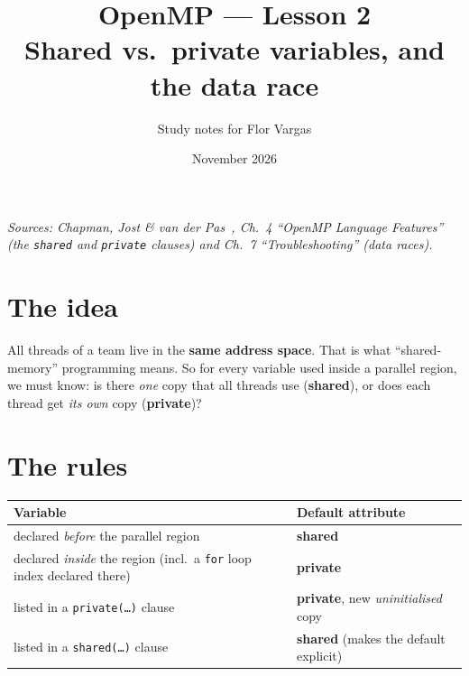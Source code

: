 \documentclass[11pt,a4paper]{article}
\title{\textbf{OpenMP --- Lesson 2}\\[4pt]\large Shared vs.\ private variables, and the data race}
\author{Study notes for Flor Vargas}
\date{November 2026}
\begin{document}
\maketitle

\noindent\textit{\small Sources: Chapman, Jost \& van der Pas~\cite{chapman}, Ch.~4
``OpenMP Language Features'' (the \texttt{shared} and \texttt{private} clauses) and
Ch.~7 ``Troubleshooting'' (data races).}

\section{The idea}
All threads of a team live in the \textbf{same address space}. That is what
``shared-memory'' programming means. So for every variable used inside a parallel region,
we must know: is there \emph{one} copy that all threads use (\textbf{shared}), or does each
thread get \emph{its own} copy (\textbf{private})?

\begin{center}
\end{center}

\section{The rules}
\begin{center}
\begin{tabular}{@{}ll@{}}
\toprule
Variable & Default attribute \\ \midrule
declared \emph{before} the parallel region & \textbf{shared} \\
declared \emph{inside} the region (incl.\ a \texttt{for} loop index declared there) & \textbf{private} \\
listed in a \texttt{private(\ldots)} clause & \textbf{private}, new \emph{uninitialised} copy \\
listed in a \texttt{shared(\ldots)} clause & \textbf{shared} (makes the default explicit) \\
\bottomrule
\end{tabular}
\end{center}
\end{document}
